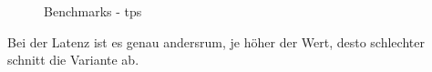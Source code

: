 \begin{flushleft}
    \begin{figure}[H]
        \centering
        \qquad
        \caption{Benchmarks - tps}
        \label{fig:tps_varianten}
    \end{figure}
    Bei der Latenz ist es genau andersrum, je höher der Wert, desto schlechter schnitt die Variante ab.\\
%


\end{flushleft}
